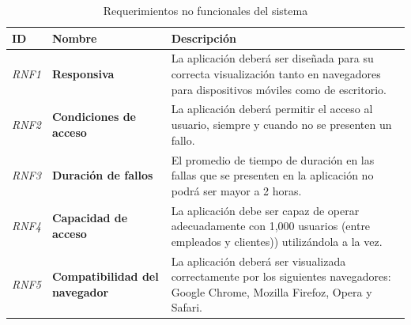 \documentclass[12pt]{article}
\begin{document}
{\small
\begin{longtable}[H]{m{2cm}m{4cm}m{6cm}}
    \caption{\normalsize{Requerimientos no funcionales del sistema}}\\
    
    \toprule
    
    \centering \textbf{ID} & \centering  \textbf{Nombre} & \centering \small \textbf{Descripción} \tabularnewline
    \midrule
    \textit{RNF1} & \textbf{Responsiva} & La aplicación deberá ser diseñada para su correcta visualización tanto en navegadores para dispositivos móviles como de escritorio. \tabularnewline
    \textit{RNF2} & \textbf{Condiciones de acceso} & La aplicación deberá permitir el acceso al usuario, siempre y cuando no se presenten un fallo. \tabularnewline
    \textit{RNF3} & \textbf{Duración de fallos} & El promedio de tiempo de duración en las fallas que se presenten en la aplicación no podrá ser mayor a 2 horas. \tabularnewline
    \textit{RNF4} & \textbf{Capacidad de acceso} & La aplicación debe ser capaz de operar adecuadamente con 1,000 usuarios (entre empleados y clientes)) utilizándola a la vez. \tabularnewline
    \textit{RNF5} & \textbf{Compatibilidad del navegador} & La aplicación deberá ser visualizada correctamente por los siguientes navegadores: Google Chrome, Mozilla Firefoz, Opera y Safari. \tabularnewline
    \bottomrule
\end{longtable}
}
\end{document}
